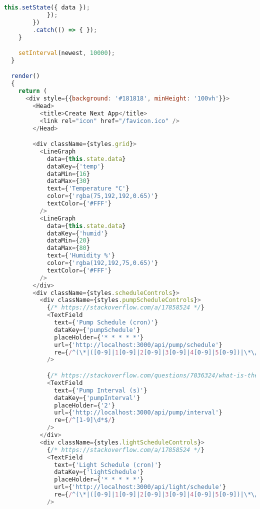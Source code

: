 \begin{lstlisting}[title={index.js}, language=JavaScript]
              this.setState({ data });
            });
        })
        .catch(() => { });
    }

    setInterval(newest, 10000);
  }

  render()
  {
    return (
      <div style={{background: '#181818', minHeight: '100vh'}}>
        <Head>
          <title>Create Next App</title>
          <link rel="icon" href="/favicon.ico" />
        </Head>

        <div className={styles.grid}>
          <LineGraph
            data={this.state.data}
            dataKey={'temp'}
            dataMin={16}
            dataMax={30}
            text={'Temperature °C'}
            color={'rgba(75,192,192,0.65)'}
            textColor={'#FFF'}
          />
          <LineGraph
            data={this.state.data}
            dataKey={'humid'}
            dataMin={20}
            dataMax={80}
            text={'Humidity %'}
            color={'rgba(192,192,75,0.65)'}
            textColor={'#FFF'}
          />
        </div>
        <div className={styles.scheduleControls}>
          <div className={styles.pumpScheduleControls}>
            {/* https://stackoverflow.com/a/17858524 */}
            <TextField
              text={'Pump Schedule (cron)'}
              dataKey={'pumpSchedule'}
              placeHolder={'* * * * *'}
              url={'http://localhost:3000/api/pump/schedule'}
              re={/^(\*|([0-9]|1[0-9]|2[0-9]|3[0-9]|4[0-9]|5[0-9])|\*\/([0-9]|1[0-9]|2[0-9]|3[0-9]|4[0-9]|5[0-9])) (\*|([0-9]|1[0-9]|2[0-3])|\*\/([0-9]|1[0-9]|2[0-3])) (\*|([1-9]|1[0-9]|2[0-9]|3[0-1])|\*\/([1-9]|1[0-9]|2[0-9]|3[0-1])) (\*|([1-9]|1[0-2])|\*\/([1-9]|1[0-2])) (\*|([0-6])|\*\/([0-6]))$/}
            />

            {/* https://stackoverflow.com/questions/7036324/what-is-the-regex-for-any-positive-integer-excluding-0 */}
            <TextField
              text={'Pump Interval (s)'}
              dataKey={'pumpInterval'}
              placeHolder={'2'}
              url={'http://localhost:3000/api/pump/interval'}
              re={/^[1-9]\d*$/}
            />
          </div>
          <div className={styles.lightScheduleControls}>
            {/* https://stackoverflow.com/a/17858524 */}
            <TextField
              text={'Light Schedule (cron)'}
              dataKey={'lightSchedule'}
              placeHolder={'* * * * *'}
              url={'http://localhost:3000/api/light/schedule'}
              re={/^(\*|([0-9]|1[0-9]|2[0-9]|3[0-9]|4[0-9]|5[0-9])|\*\/([0-9]|1[0-9]|2[0-9]|3[0-9]|4[0-9]|5[0-9])) (\*|([0-9]|1[0-9]|2[0-3])|\*\/([0-9]|1[0-9]|2[0-3])) (\*|([1-9]|1[0-9]|2[0-9]|3[0-1])|\*\/([1-9]|1[0-9]|2[0-9]|3[0-1])) (\*|([1-9]|1[0-2])|\*\/([1-9]|1[0-2])) (\*|([0-6])|\*\/([0-6]))$/}
            />
            

\end{lstlisting}
